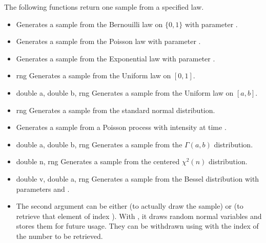 The following functions return one sample from a specified law.
\begin{itemize}
\item {}
  \sshortdescribe Generates a sample from the Bernouilli law on $\{0, 1\}$ with
  parameter .

\item {}
  \sshortdescribe Generates a sample from the Poisson law with
  parameter .

\item {}
  \sshortdescribe Generates a sample from the Exponential law with
  parameter .

\item {} { \ptr rng}
  \sshortdescribe Generates a sample from the Uniform law on $[0, 1]$.

\item {} {double a, double b,
     \ptr rng}
  \sshortdescribe Generates a sample from the Uniform law on $[a, b]$.

\item {} { \ptr rng}
  \sshortdescribe Generates a sample from the standard normal distribution.

\item {}
  \sshortdescribe Generates a sample from a Poisson process with intensity
   at time .

\item {} {double a, double b,  \ptr rng}
  \sshortdescribe Generates a sample from the $\Gamma(a, b)$ distribution.

\item {} {double n,  \ptr rng}
  \sshortdescribe Generates a sample from the centered $\chi^2(n)$ distribution.
\item {} {double v, double a, \ptr rng}
  \sshortdescribe Generates a sample from the Bessel distribution with parameters
   and .
\item {}
  \sshortdescribe The second argument can be either  (to actually
  draw the sample) or  (to retrieve that element of index
  ). With , it draws  random normal variables
  and stores them for future usage. They can be withdrawn using 
  with the index of the number to be retrieved.
\end{itemize}

